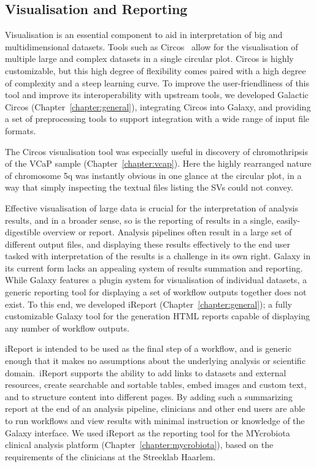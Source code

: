 \subsection{Visualisation and Reporting}
Visualisation is an essential component to aid in interpretation of big and multidimensional datasets. Tools such as Circos~\cite{circos} allow for the visualisation of multiple large and complex datasets in a single circular plot. Circos is highly customizable, but this high degree of flexibility comes paired with a high degree of complexity and a steep learning curve. To improve the user-friendliness of this tool and improve its interoperability with upstream tools, we developed Galactic Circos (Chapter~\ref{chapter:general}), integrating Circos into Galaxy, and providing a set of preprocessing tools to support integration with a wide range of input file formats.

The Circos visualisation tool was especially useful in discovery of chromothripsis of the VCaP sample (Chapter~\ref{chapter:vcap}).
Here the highly rearranged nature of chromosome 5q was instantly obvious in one glance at the circular plot, in a way that simply inspecting the textual files listing the SVs could not convey.

Effective visualisation of large data is crucial for the interpretation of analysis results, and in a broader sense, so is the reporting of results in a single, easily-digestible overview or report. Analysis pipelines often result in a large set of different output files, and displaying these results effectively to the end user tasked with interpretation of the results is a challenge in its own right.
Galaxy in its current form lacks an appealing system of results summation and reporting. While Galaxy features a plugin system for visualisation of individual datasets, a generic reporting tool for displaying a set of workflow outputs together does not exist. To this end, we developed iReport (Chapter~\ref{chapter:general}); a fully customizable Galaxy tool for the generation HTML reports capable of displaying any number of workflow outputs.\

iReport is intended to be used as the final step of a workflow, and is generic enough that it makes no assumptions about the underlying analysis or scientific domain.\ iReport supports  the ability to add links to datasets and external resources, create searchable and sortable tables, embed images and custom text, and to structure content into different pages.
By adding such a summarizing report at the end of an analysis pipeline, clinicians and other end users are able to run workflows and view results with minimal instruction or knowledge of the Galaxy interface.
We used iReport as the reporting tool for the MYcrobiota clinical analysis platform (Chapter~\ref{chapter:mycrobiota}), based on the requirements of the clinicians at the Streeklab Haarlem.


